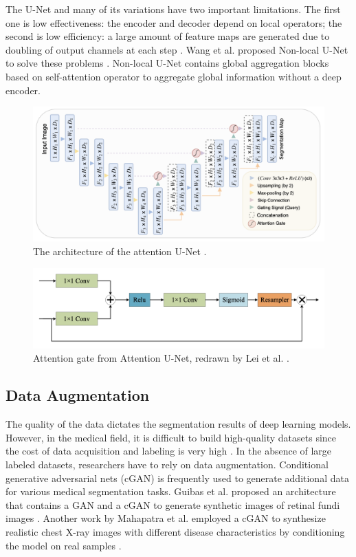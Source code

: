 \documentclass [11pt, proquest] {uwthesis}[2020/02/24]
\begin{document}
The U-Net and many of its variations have two important limitations. The first one 
is low effectiveness: the encoder and decoder depend on local operators; the second 
is low efficiency: a large amount of feature maps are generated due to doubling of 
output channels at each step \cite{wang_non-local_2020}. Wang et al. proposed Non-local
 U-Net to solve these problems \cite{wang_non-local_2020}. Non-local U-Net contains 
 global aggregation blocks based on self-attention operator to aggregate global 
 information without a deep encoder.

\begin{figure}
  \centering
  \includegraphics[width=0.8\linewidth]{figures/attentionUnet.png}
  \caption{The architecture of the attention U-Net \cite{oktay_attention_nodate}.}
  \label{attentionUnet}
\end{figure}

\begin{figure}
  \centering
  \includegraphics[width=0.7\linewidth]{figures/attentionGate.png}
  \caption{Attention gate from Attention U-Net\cite{oktay_attention_nodate}, redrawn by Lei et al. \cite{lei_medical_2020}.}
  \label{attentionGate}
\end{figure}


\subsection{Data Augmentation}

The quality of the data dictates the segmentation results of deep learning models. However, 
in the medical field, it is difficult to build high-quality datasets since the cost of data 
acquisition and labeling is very high \cite{lei_medical_2020}. In the absence of large 
labeled datasets, researchers have to rely on data augmentation. Conditional generative 
adversarial nets (cGAN) is frequently used to generate additional data for various medical 
segmentation tasks. Guibas et al. proposed an architecture that contains a GAN and a cGAN 
to generate synthetic images of retinal fundi images \cite{guibas_synthetic_2018}. Another 
work by Mahapatra et al. employed a cGAN to synthesize realistic chest X-ray images with 
different disease characteristics by conditioning the model on real samples 
\cite{mahapatra_efficient_2018}.
\end{document}
